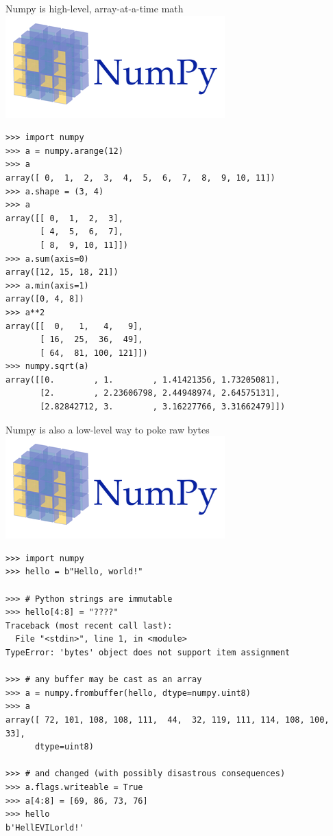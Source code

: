 \documentclass[aspectratio=169]{beamer}
\begin{document}
\begin{frame}[fragile]{Numpy is high-level, array-at-a-time math}
\vspace{0.5 cm}
\hfill \includegraphics[height=1.5 cm]{numpy-logo.png}

\scriptsize
\vspace{-1.5 cm}
\begin{verbatim}
>>> import numpy
>>> a = numpy.arange(12)
>>> a
array([ 0,  1,  2,  3,  4,  5,  6,  7,  8,  9, 10, 11])
>>> a.shape = (3, 4)
>>> a
array([[ 0,  1,  2,  3],
       [ 4,  5,  6,  7],
       [ 8,  9, 10, 11]])
>>> a.sum(axis=0)
array([12, 15, 18, 21])
>>> a.min(axis=1)
array([0, 4, 8])
>>> a**2
array([[  0,   1,   4,   9],
       [ 16,  25,  36,  49],
       [ 64,  81, 100, 121]])
>>> numpy.sqrt(a)
array([[0.        , 1.        , 1.41421356, 1.73205081],
       [2.        , 2.23606798, 2.44948974, 2.64575131],
       [2.82842712, 3.        , 3.16227766, 3.31662479]])
\end{verbatim}
\end{frame}

\begin{frame}[fragile]{Numpy is also a low-level way to poke raw bytes}
\vspace{0.5 cm}
\hfill \includegraphics[height=1.5 cm]{numpy-logo.png}

\scriptsize
\vspace{-1.5 cm}
\begin{verbatim}
>>> import numpy
>>> hello = b"Hello, world!"

>>> # Python strings are immutable
>>> hello[4:8] = "????"
Traceback (most recent call last):
  File "<stdin>", line 1, in <module>
TypeError: 'bytes' object does not support item assignment

>>> # any buffer may be cast as an array
>>> a = numpy.frombuffer(hello, dtype=numpy.uint8)
>>> a
array([ 72, 101, 108, 108, 111,  44,  32, 119, 111, 114, 108, 100,  33],
      dtype=uint8)

>>> # and changed (with possibly disastrous consequences)
>>> a.flags.writeable = True
>>> a[4:8] = [69, 86, 73, 76]
>>> hello
b'HellEVILorld!'
\end{verbatim}
\end{frame}
\end{document}
